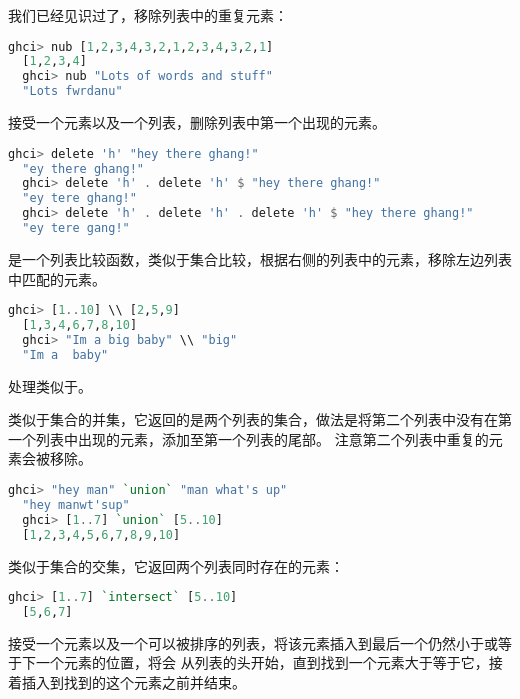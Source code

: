\documentclass[./main.tex]{subfiles}
\begin{document}
我们已经见识过了，移除列表中的重复元素：

\begin{lstlisting}[language=Haskell]
  ghci> nub [1,2,3,4,3,2,1,2,3,4,3,2,1]
  [1,2,3,4]
  ghci> nub "Lots of words and stuff"
  "Lots fwrdanu"
\end{lstlisting}

接受一个元素以及一个列表，删除列表中第一个出现的元素。

\begin{lstlisting}[language=Haskell]
  ghci> delete 'h' "hey there ghang!"
  "ey there ghang!"
  ghci> delete 'h' . delete 'h' $ "hey there ghang!"
  "ey tere ghang!"
  ghci> delete 'h' . delete 'h' . delete 'h' $ "hey there ghang!"
  "ey tere gang!"
\end{lstlisting}

\acode{\\\\}是一个列表比较函数，类似于集合比较，根据右侧的列表中的元素，移除左边列表中匹配的元素。

\begin{lstlisting}[language=Haskell]
  ghci> [1..10] \\ [2,5,9]
  [1,3,4,6,7,8,10]
  ghci> "Im a big baby" \\ "big"
  "Im a  baby"
\end{lstlisting}

处理\acode{[1..10] \\\\ [2,5,9]}类似于。

类似于集合的并集，它返回的是两个列表的集合，做法是将第二个列表中没有在第一个列表中出现的元素，添加至第一个列表的尾部。
注意第二个列表中重复的元素会被移除。

\begin{lstlisting}[language=Haskell]
  ghci> "hey man" `union` "man what's up"
  "hey manwt'sup"
  ghci> [1..7] `union` [5..10]
  [1,2,3,4,5,6,7,8,9,10]
\end{lstlisting}

类似于集合的交集，它返回两个列表同时存在的元素：

\begin{lstlisting}[language=Haskell]
  ghci> [1..7] `intersect` [5..10]
  [5,6,7]
\end{lstlisting}

接受一个元素以及一个可以被排序的列表，将该元素插入到最后一个仍然小于或等于下一个元素的位置，将会
从列表的头开始，直到找到一个元素大于等于它，接着插入到找到的这个元素之前并结束。
\end{document}
